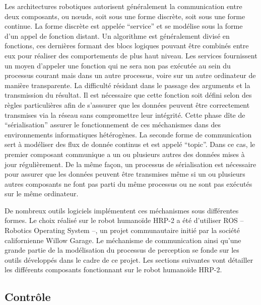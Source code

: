 Les architectures robotiques autorisent généralement la communication
entre deux composants, ou n\oe uds, soit sous une forme discrète, soit
sous une forme continue. La forme discrète est appelée ``service'' et
se modélise sous la forme d'un appel de fonction distant. Un
algorithme est généralement divisé en fonctions, ces dernières formant
des blocs logiques pouvant être combinés entre eux pour réaliser des
comportements de plus haut niveau. Les services fournissent un moyen
d'appeler une fonction qui ne sera non pas exécutée au sein du
processus courant mais dans un autre processus, voire sur un autre
ordinateur de manière transparente. La difficulté résidant dans le
passage des arguments et la transmission du résultat. Il est
nécessaire que cette fonction soit défini selon des règles
particulières afin de s'asssurer que les données peuvent être
correctement transmises via la réseau sans compromettre leur
intégrité. Cette phase dîte de ``sérialisation'' assurer le
fonctionnement de ces méchanismes dans des environnements
informatiques hétérogènes. La seconde forme de communication sert à
modéliser des flux de donnée continus et est appelé ``topic''. Dans ce
cas, le premier composant communique a un ou plusieurs autres des
données mises à jour régulièrement. De la même façon, un processus de
sérialisation est nécessaire pour assurer que les données peuvent être
transmises même si un ou plusieurs autres composants ne font pas parti
du même processus ou ne sont pas exécutés sur le même ordinateur.


De nombreux outils logiciels implémentent ces méchanismes sous
différentes formes. Le choix réalisé sur le robot humanoïde HRP-2 a
été d'utiliser ROS -- Robotics Operating System --, un projet
communautaire initié par la société californienne Willow Garage. Le
méchanisme de communication ainsi qu'une grande partie de la
modélisation du processus de perception se fonde sur les outils
développés dans le cadre de ce projet. Les sections suivantes vont
détailler les différents composants fonctionnant sur le robot
humanoïde HRP-2.



\subsection{Contrôle}

